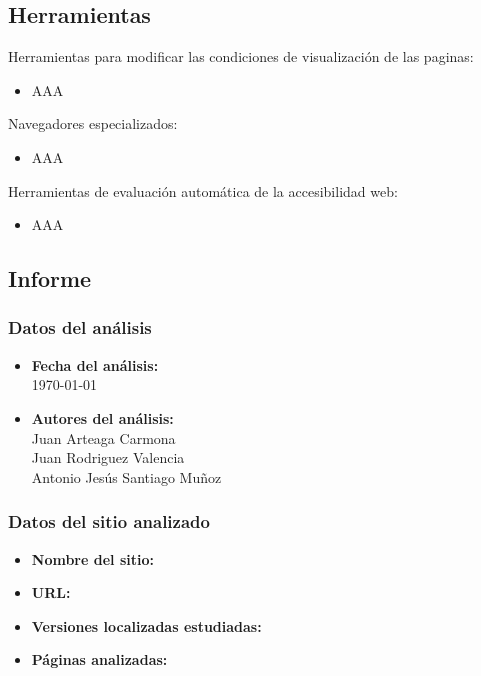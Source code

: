 \documentclass[a4paper,11pt]{article}
\begin{document}
\subsection{Herramientas}
Herramientas para modificar las condiciones de visualización de las paginas:
\begin{itemize}
  \item AAA
\end{itemize}

Navegadores especializados:
\begin{itemize}
  \item AAA
\end{itemize}

Herramientas de evaluación automática de la accesibilidad web:
\begin{itemize}
  \item AAA
\end{itemize}

\subsection{Informe}
\subsubsection{Datos del análisis}
\begin{itemize}
  \item \textbf{Fecha del análisis:}\\
  \today
  \item \textbf{Autores del análisis:}\\
      Juan Arteaga Carmona\\
      Juan Rodriguez Valencia\\
      Antonio Jesús Santiago Muñoz
\end{itemize}

\subsubsection{Datos del sitio analizado}
\begin{itemize}
\item \textbf{Nombre del sitio:}\\
\item \textbf{URL:}\\
\item \textbf{Versiones localizadas estudiadas:}\\
\item \textbf{Páginas analizadas:}\\
\end{itemize}
\end{document}
